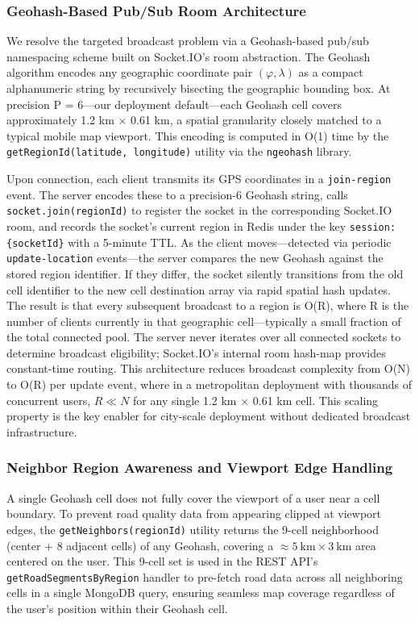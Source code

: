 \documentclass[conference]{IEEEtran}
\begin{document}
\subsubsection{Geohash-Based Pub/Sub Room Architecture}
We resolve the targeted broadcast problem via a Geohash-based pub/sub namespacing scheme built on Socket.IO's room abstraction. The Geohash algorithm encodes any geographic coordinate pair $(\varphi, \lambda)$ as a compact alphanumeric string by recursively bisecting the geographic bounding box. At precision P = 6---our deployment default---each Geohash cell covers approximately 1.2 km $\times$ 0.61 km, a spatial granularity closely matched to a typical mobile map 
viewport. This encoding is computed in O(1) time by the \texttt{getRegionId(latitude, longitude)} utility via the \texttt{ngeohash} library.

Upon connection, each client transmits its GPS coordinates in a \texttt{join-region} event.
The server encodes these to a precision-6 Geohash string, calls \texttt{socket.join(regionId)} to register the socket in the corresponding Socket.IO room, and records the socket's current region in Redis under the key \texttt{session:\{socketId\}} with a 5-minute TTL.
As the client moves---detected via periodic \texttt{update-location} events---the server compares the new Geohash against the stored region identifier.
If they differ, the socket silently transitions from the old cell identifier to the new cell destination array via rapid spatial hash updates.
The result is that every subsequent broadcast to a region is O(R), where R is the number of clients currently in that geographic cell---typically a small fraction of the total connected pool. The server never iterates over all connected sockets to determine broadcast eligibility; Socket.IO's internal room hash-map provides constant-time routing. This architecture reduces broadcast complexity from O(N) to O(R) per update event, where in a metropolitan deployment with thousands of concurrent users, $R \ll N$ for any single 1.2 km $\times$ 0.61 km cell. This scaling property is the key enabler for city-scale deployment without dedicated broadcast infrastructure.

\subsubsection{Neighbor Region Awareness and Viewport Edge Handling}
A single Geohash cell does not fully cover the viewport of a user near a cell boundary. To prevent road quality data from appearing clipped at viewport edges, the \texttt{getNeighbors(regionId)} utility returns the 9-cell neighborhood (center + 8 adjacent cells) of any Geohash, covering a $\approx 5~\text{km} \times 3~\text{km}$ area centered on the user.
This 9-cell set is used in the REST API's \texttt{getRoadSegmentsByRegion} handler to pre-fetch road data across all neighboring cells in a single MongoDB query, ensuring seamless map coverage regardless of the user's position within their Geohash cell.
\end{document}
